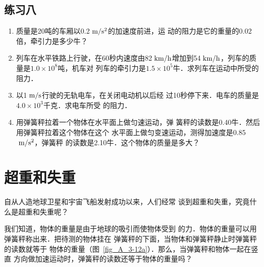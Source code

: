  \subsection*{练习八}
\begin{enumerate}
\item 质量是20吨的车厢以0.2$\;\text{m}/\text{s}^2$的加速度前进，运
动的阻力是它的重量的0.02倍，牵引力是多少牛？
\item  列车在水平铁路上行驶，在60秒内速度由82$\;\text{km}/\text{h}$增加到54$\;\text{km}/\text{h}$，列车的质量是$1.0\times 10^8$吨，机车对
列车的牵引力是$1.5\times 10^5$牛．求列车在运动中所受的阻力．
\item  以1$\;\text{m}/\text{s}$行驶的无轨电车，在关闭电动机以后经
过10秒停下来．电车的质量是$4.0\times 10^3$千克．求电车所受
的阻力．
\item  用弹簧秤拉着一个物体在水平面上做匀速运动，弹
簧秤的读数是0.40牛．然后用弹簧秤拉着这个物体在这个
水平面上做匀变速运动，测得加速度是0.85$\;\text{m}/\text{s}^2$，弹簧秤
的读数是2.10牛．这个物体的质量是多大？
\end{enumerate}

\section{超重和失重}
    自从人造地球卫星和宇宙飞船发射成功以来，人们经常
谈到超重和失重，究竟什么是超重和失重呢？

    我们知道，物体的重量是由于地球的吸引而使物体受到
的力．物体的重量可以用弹簧秤称出来．把待测的物体挂在
弹簧秤的下面，当物体和弹簧秤静止时弹簧秤的读数就等于
物体的重量（图~\ref{fig_A_3-12a}）．那么，当弹簧秤和物体一起在竖直
方向做加速运动时，弹簧秤的读数还等于物体的重量吗？


